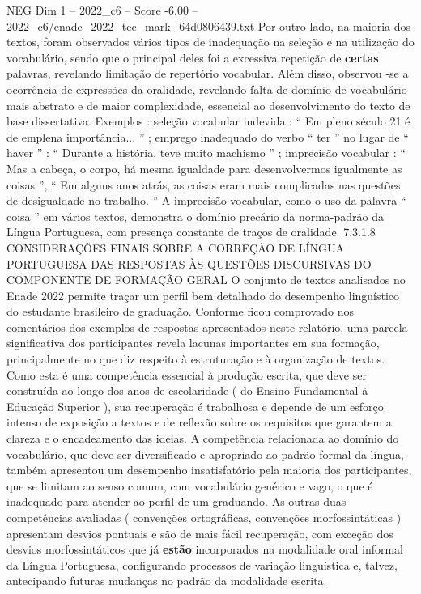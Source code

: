 \begin{textsample}{NEG Dim 1 – 2022\_c6 – Score -6.00 – 2022\_c6/enade\_2022\_tec\_mark\_64d0806439.txt}
Por outro lado, na maioria dos textos, foram observados vários tipos de inadequação na seleção e na utilização do vocabulário, sendo que o principal deles foi a excessiva repetição de \textbf{certas} palavras, revelando limitação de repertório vocabular.
Além disso, observou -se a ocorrência de expressões da oralidade, revelando falta de domínio de vocabulário mais abstrato e de maior complexidade, essencial ao desenvolvimento do texto de base dissertativa.
Exemplos : seleção vocabular indevida : “ Em pleno século 21 é de emplena importância... ” ; emprego inadequado do verbo “ ter ” no lugar de “ haver ” : “ Durante a história, teve muito machismo ” ; imprecisão vocabular : “ Mas a cabeça, o corpo, há mesma igualdade para desenvolvermos igualmente as coisas ”, “ Em alguns anos atrás, as coisas eram mais complicadas nas questões de desigualdade no trabalho. ” A imprecisão vocabular, como o uso da palavra “ coisa ” em vários textos, demonstra o domínio precário da norma-padrão da Língua Portuguesa, com presença constante de traços de oralidade. 7.3.1.8 CONSIDERAÇÕES FINAIS SOBRE A CORREÇÃO DE LÍNGUA PORTUGUESA DAS RESPOSTAS ÀS QUESTÕES DISCURSIVAS DO COMPONENTE DE FORMAÇÃO GERAL O conjunto de textos analisados no Enade 2022 permite traçar um perfil bem detalhado do desempenho linguístico do estudante brasileiro de graduação.
Conforme ficou comprovado nos comentários dos exemplos de respostas apresentados neste relatório, uma parcela significativa dos participantes revela lacunas importantes em sua formação, principalmente no que diz respeito à estruturação e à organização de textos.
Como esta é uma competência essencial à produção escrita, que deve ser construída ao longo dos anos de escolaridade ( do Ensino Fundamental à Educação Superior ), sua recuperação é trabalhosa e depende de um esforço intenso de exposição a textos e de reflexão sobre os requisitos que garantem a clareza e o encadeamento das ideias.
A competência relacionada ao domínio do vocabulário, que deve ser diversificado e apropriado ao padrão formal da língua, também apresentou um desempenho insatisfatório pela maioria dos participantes, que se limitam ao senso comum, com vocabulário genérico e vago, o que é inadequado para atender ao perfil de um graduando.
As outras duas competências avaliadas ( convenções ortográficas, convenções morfossintáticas ) apresentam desvios pontuais e são de mais fácil recuperação, com exceção dos desvios morfossintáticos que já \textbf{estão} incorporados na modalidade oral informal da Língua Portuguesa, configurando processos de variação linguística e, talvez, antecipando futuras mudanças no padrão da modalidade escrita.

\end{textsample}
